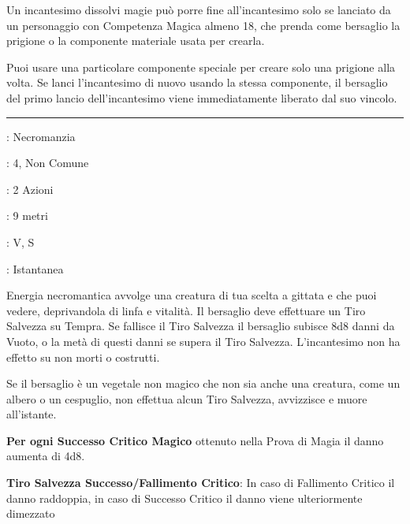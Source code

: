 \begin{multicols}{2}
Un incantesimo dissolvi magie può porre fine all'incantesimo solo se lanciato da un personaggio con Competenza Magica almeno 18, che prenda come bersaglio la prigione o la componente materiale usata per crearla.

Puoi usare una particolare componente speciale per creare solo una prigione alla volta. Se lanci l'incantesimo di nuovo usando la stessa componente, il bersaglio del primo lancio dell'incantesimo viene immediatamente liberato dal suo vincolo.

\smallskip\noindent\rule{\linewidth}{2pt} \hypertarget{Inaridire}{}\smallskip{}
\noindent
\begin{description}[noitemsep, topsep=0pt, parsep=0pt, partopsep=0pt, leftmargin=0cm, labelwidth=2.8cm]
	\item[\textbf{Lista di Magia}]: Necromanzia
	\item[\textbf{Livello}]: 4, Non Comune
	\item[\textbf{T. di Lancio}]: 2 Azioni
	\item[\textbf{Gittata}]: 9 metri
	\item[\textbf{Componenti}]: V, S
	\item[\textbf{Durata}]: Istantanea
\end{description}

Energia necromantica avvolge una creatura di tua scelta a gittata e che puoi vedere, deprivandola di linfa e vitalità. Il bersaglio deve effettuare un Tiro Salvezza su Tempra. Se fallisce il Tiro Salvezza il bersaglio subisce 8d8 danni da Vuoto, o la metà di questi danni se supera il Tiro Salvezza. L'incantesimo non ha effetto su non morti o costrutti.

Se il bersaglio è un vegetale non magico che non sia anche una creatura, come un albero o un cespuglio, non effettua alcun Tiro Salvezza, avvizzisce e muore all'istante.

\textbf{Per ogni Successo Critico Magico} ottenuto nella Prova di Magia il danno aumenta di 4d8.

\textbf{Tiro Salvezza Successo/Fallimento Critico}: In caso di Fallimento Critico il danno raddoppia, in caso di Successo Critico il danno viene ulteriormente dimezzato


\end{multicols}
